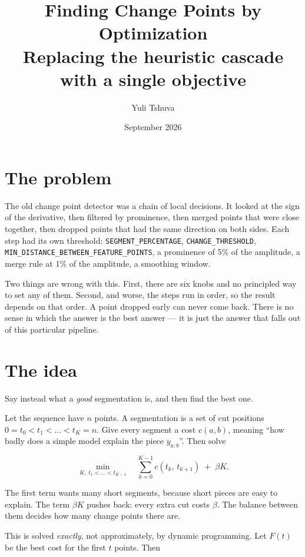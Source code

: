 \documentclass[11pt]{article}
\title{Finding Change Points by Optimization\\
\large Replacing the heuristic cascade with a single objective}
\author{Yuli Tshuva}
\date{September 2026}
\begin{document}
\maketitle

\section{The problem}

The old change point detector was a chain of local decisions. It looked at the
sign of the derivative, then filtered by prominence, then merged points that were
close together, then dropped points that had the same direction on both sides.
Each step had its own threshold: \texttt{SEGMENT\_PERCENTAGE},
\texttt{CHANGE\_THRESHOLD}, \texttt{MIN\_DISTANCE\_BETWEEN\_FEATURE\_POINTS},
a prominence of 5\% of the amplitude, a merge rule at 1\% of the amplitude, a
smoothing window.

Two things are wrong with this. First, there are six knobs and no principled way
to set any of them. Second, and worse, the steps run in order, so the result
depends on that order. A point dropped early can never come back. There is no
sense in which the answer is the best answer --- it is just the answer that
falls out of this particular pipeline.

\section{The idea}

Say instead what a \emph{good} segmentation is, and then find the best one.

Let the sequence have $n$ points. A segmentation is a set of cut positions
$0 = t_0 < t_1 < \dots < t_K = n$. Give every segment a cost $c(a,b)$, meaning
``how badly does a simple model explain the piece $y_{a:b}$''. Then solve

\begin{equation}
\min_{K,\; t_1 < \dots < t_{K-1}} \quad
\sum_{k=0}^{K-1} c(t_k,\, t_{k+1}) \;+\; \beta K .
\label{eq:main}
\end{equation}

The first term wants many short segments, because short pieces are easy to
explain. The term $\beta K$ pushes back: every extra cut costs $\beta$. The
balance between them decides how many change points there are.

This is solved \emph{exactly}, not approximately, by dynamic programming. Let
$F(t)$ be the best cost for the first $t$ points. Then
\end{document}
